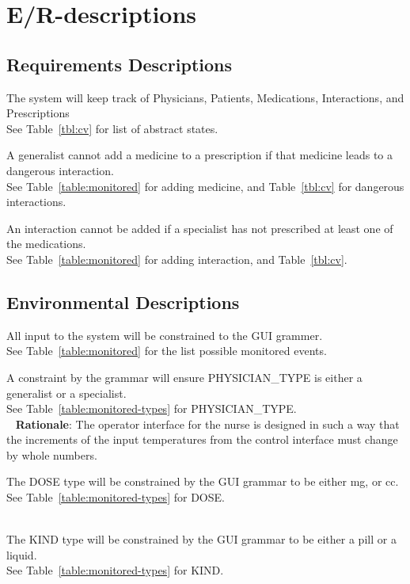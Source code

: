 \section{E/R-descriptions}

\subsection{Requirements Descriptions}
{The system will keep track of Physicians, Patients, Medications, Interactions, and Prescriptions\\}
{ See Table~\ref{tbl:cv} for list of abstract states.\\}
\label{R1}

{A generalist cannot add a medicine to a prescription if that medicine leads to a dangerous interaction. \\}
{ See Table~\ref{table:monitored} for adding medicine, and Table~\ref{tbl:cv} for dangerous interactions.\\}
\label{R2}

{An interaction cannot be added if a specialist has not prescribed at least one of the medications.\\}
{ See Table~\ref{table:monitored} for adding interaction, and Table~\ref{tbl:cv}.\\}
\label{R3}

\subsection{Environmental Descriptions}
{All input to the system will be constrained to the GUI grammer.\\}
{ See Table~\ref{table:monitored} for the list possible monitored events.\\}
\label{E1}

{A constraint by the grammar will ensure PHYSICIAN\_TYPE is either a generalist or a specialist.\\}
{ See Table~\ref{table:monitored-types} for PHYSICIAN\_TYPE.\\~}
\label{E2}
\noindent \textbf{Rationale}: The operator interface for the nurse is designed in such a way that the increments of the input temperatures from the control interface must change by whole numbers.

{The DOSE type will be constrained by the GUI grammar to be either mg, or cc.\\}
{ See Table~\ref{table:monitored-types} for DOSE.\\~}
\label{E3}

{The KIND type will be constrained by the GUI grammar to be either a pill or a liquid.\\}
{ See Table~\ref{table:monitored-types} for KIND.\\~}
\label{E4}
